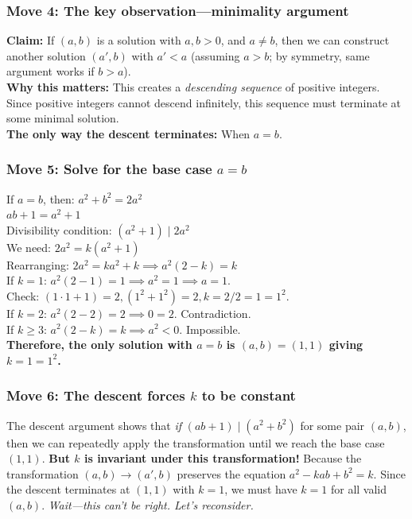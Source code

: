\documentclass{article}
\begin{document}
\subsubsection*{Move 4: The key observation—minimality argument}
\textbf{Claim:} If $(a, b)$ is a solution with $a, b > 0$, and $a \neq b$, then we can construct another solution $(a', b)$ with $a' < a$ (assuming $a > b$; by symmetry, same argument works if $b > a$). \\
\textbf{Why this matters:} This creates a \textit{descending sequence} of positive integers. Since positive integers cannot descend infinitely, this sequence must terminate at some minimal solution. \\
\textbf{The only way the descent terminates:} When $a = b$. \\

\subsubsection*{Move 5: Solve for the base case $a = b$}
If $a = b$, then:
$a^2 + b^2 = 2a^2$ \\
$ab + 1 = a^2 + 1$ \\
Divisibility condition: $(a^2 + 1) \mid 2a^2$ \\
We need: $2a^2 = k(a^2 + 1)$ \\
Rearranging: $2a^2 = ka^2 + k \implies a^2(2 - k) = k$ \\
If $k = 1$: $a^2(2 - 1) = 1 \implies a^2 = 1 \implies a = 1$. \\
Check: $(1 \cdot 1 + 1) = 2, (1^2 + 1^2) = 2, k = 2/2 = 1 = 1^2$. \checkmark \\
If $k = 2$: $a^2(2 - 2) = 2 \implies 0 = 2$. Contradiction. \\
If $k \geq 3$: $a^2(2 - k) = k \implies a^2 < 0$. Impossible. \\
\textbf{Therefore, the only solution with $a = b$ is $(a, b) = (1, 1)$ giving $k = 1 = 1^2$.} \\

\subsubsection*{Move 6: The descent forces $k$ to be constant}
The descent argument shows that \textit{if} $(ab + 1) \mid (a^2 + b^2)$ for some pair $(a, b)$, then we can repeatedly apply the transformation until we reach the base case $(1, 1)$. \textbf{But $k$ is invariant under this transformation!} Because the transformation $(a, b) \to (a', b)$ preserves the equation $a^2 - kab + b^2 = k$. Since the descent terminates at $(1, 1)$ with $k = 1$, we must have $k = 1$ for all valid $(a, b)$. \textit{Wait—this can't be right. Let's reconsider.} \\
\end{document}
